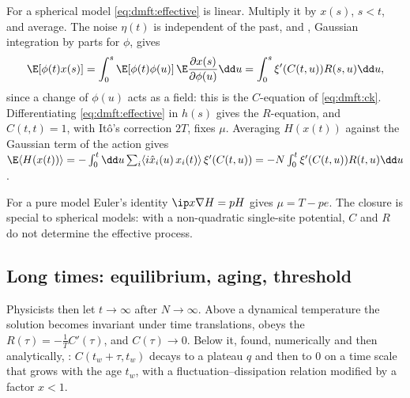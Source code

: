 \begin{refsection}
\begin{heuristic}
For a spherical model \eqref{eq:dmft:effective} is linear. Multiply it by $x(s)$, $s<t$, and average. The noise $\eta(t)$ is independent of the past, and , Gaussian integration by parts for $\phi$, gives
\[
\E[\phi(t)x(s)]=\int_0^s\E[\phi(t)\phi(u)]\,\E\frac{\partial x(s)}{\partial\phi(u)}\dd u=\int_0^s\xi'(C(t,u))R(s,u)\dd u,
\]
since a change of $\phi(u)$ acts as a field: this is the $C$-equation of \eqref{eq:dmft:ck}. Differentiating \eqref{eq:dmft:effective} in $h(s)$ gives the $R$-equation, and $C(t,t)=1$, with Itô's correction $2T$, fixes $\mu$. Averaging $H(x(t))$ against the Gaussian term of the action gives $\E\langle H(x(t))\rangle=-\int_0^t\dd u\sum_i\langle i\hat x_i(u)\,x_i(t)\rangle\,\xi'(C(t,u))=-N\int_0^t\xi'(C(t,u))R(t,u)\dd u$.
\end{heuristic}

For a pure model Euler's identity $\ip x{\nabla H}=pH$ gives $\mu=T-pe$. The closure is special to spherical models: with a non-quadratic single-site potential, $C$ and $R$ do not determine the effective process.

\subsection{Long times: equilibrium, aging, threshold}

Physicists then let $t\to\infty$ after $N\to\infty$. Above a dynamical temperature the solution becomes invariant under time translations, obeys the  $R(\tau)=-\frac1TC'(\tau)$, and $C(\tau)\to0$. Below it, \textcite{CugliandoloKurchan1993} found, numerically and then analytically, : $C(t_w+\tau,t_w)$ decays to a plateau $q$ and then to $0$ on a time scale that grows with the age $t_w$, with a fluctuation--dissipation relation modified by a factor $x<1$.


\end{refsection}
